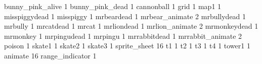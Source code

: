bunny_pink_alive 1
bunny_pink_dead 1
cannonball 1
grid 1
map1 1
misspiggydead 1
misspiggy 1
mrbeardead 1
mrbear_animate 2
mrbullydead 1
mrbully 1
mrcatdead 1
mrcat 1
mrliondead 1
mrlion_animate 2
mrmonkeydead 1
mrmonkey 1
mrpingudead 1
mrpingu 1
mrrabbitdead 1
mrrabbit_animate 2
poison 1
skate1 1
skate2 1
skate3 1
sprite_sheet 16
t1 1
t2 1
t3 1
t4 1
tower1 1
animate 16
range_indicator 1

